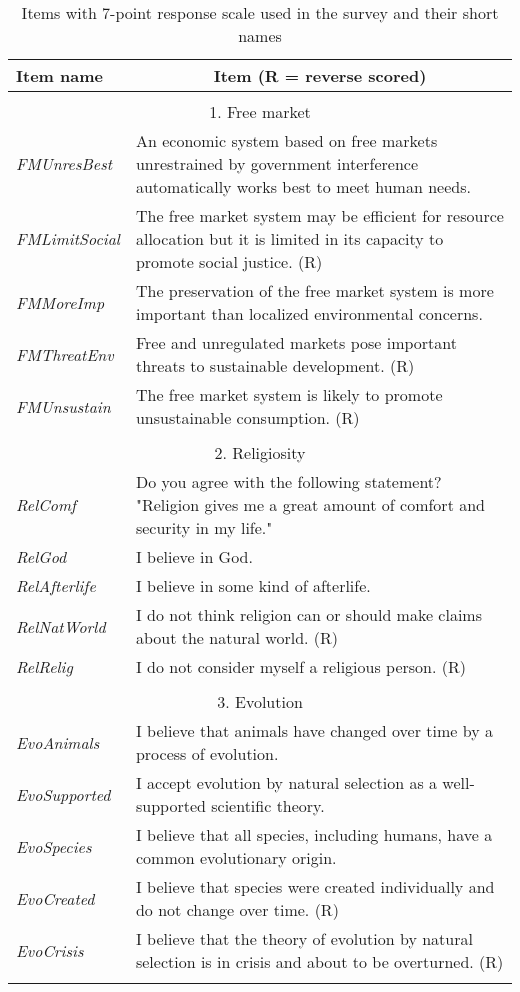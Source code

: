 \documentclass[fignum,man]{apa}\usepackage[]{graphicx}\usepackage[]{color}
\begin{document}
\pagebreak
\begin{longtable}{p{.2\linewidth} p{.8\linewidth}} %

	\caption[]{Items with 7-point response scale 
		used in the survey and their short names\label{tab:items}}\\
	\hline
	Item name & \multicolumn{1}{c}{Item (R = reverse scored)}  \\
	\hline

	\\
\hline

\multicolumn{2}{c}{1. Free market}\\
\nopagebreak
\hline
\nopagebreak
\emph{FMUnresBest}&An economic system based on free markets unrestrained by government interference automatically works best to meet human needs. \\
\emph{FMLimitSocial} &The free market system may be efficient for resource allocation  but it is limited in its capacity to promote social justice. (R)  \\
\emph{FMMoreImp}&The preservation of the free market system is more important than localized environmental concerns.  \\
\emph{FMThreatEnv} &Free and unregulated markets pose important threats to sustainable development. (R)  \\
\emph{FMUnsustain} &The free market system is likely to promote unsustainable consumption. (R) \\

	\\
	\hline
	\multicolumn{2}{c}{2. Religiosity}\\
	\nopagebreak
	\hline
	\nopagebreak
\emph{RelComf} & Do you agree with the following statement? "Religion gives me a great amount of comfort and security in my life."\\
\emph{RelGod} & I believe in God.\\
\emph{RelAfterlife} & I believe in some kind of afterlife.\\
\emph{RelNatWorld} & I do not think religion can or should make claims about the natural world. (R)\\
\emph{RelRelig} & I do not consider myself a religious person. (R)\\
	
	\\
\hline
\multicolumn{2}{c}{3. Evolution}\\
\nopagebreak
\hline
\nopagebreak
\emph{EvoAnimals} & I believe that animals have changed over time by a process of evolution.\\
\emph{EvoSupported} & I accept evolution by natural selection as a well-supported scientific theory.\\
\emph{EvoSpecies} & I believe that all species, including humans, have a common evolutionary origin.\\
\emph{EvoCreated} & I believe that species were created individually and do not change over time. (R)\\
\nopagebreak
\emph{EvoCrisis} & I believe that the theory of evolution by natural selection is in crisis and about to be overturned. (R)\\
	\\
	\hline
	

\end{longtable}
\end{document}
